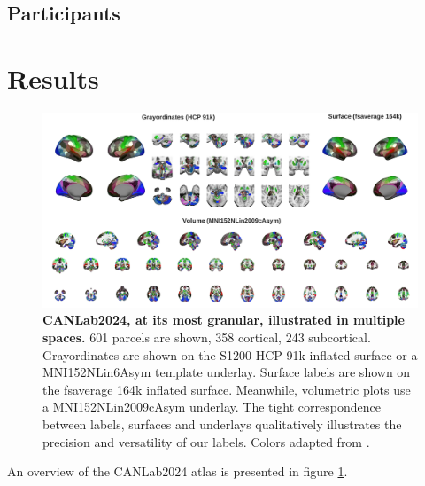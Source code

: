 \documentclass[10pt,letterpaper]{article}
\begin{document}
\subsection{Participants}


\section{Results}
\begin{figure}[t!]
\centering
\includegraphics[width=\textwidth]{images/overview_figure.png}
\caption{{\bf CANLab2024, at its most granular, illustrated in multiple spaces.} 601 parcels are shown, 358 cortical, 243 subcortical. Grayordinates are shown on the S1200 HCP 91k inflated surface or a MNI152NLin6Asym template underlay. Surface labels are shown on the fsaverage 164k inflated surface. Meanwhile, volumetric plots use a MNI152NLin2009cAsym underlay. The tight correspondence between labels, surfaces and underlays qualitatively illustrates the precision and versatility of our labels. Colors adapted from .}
\label{overview-figure}
\end{figure}

An overview of the CANLab2024 atlas is presented in figure \ref{overview-figure}.
\end{document}
